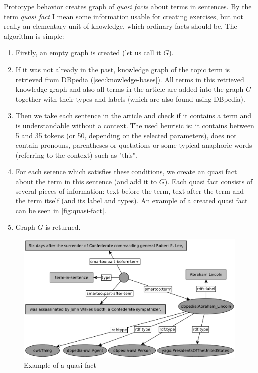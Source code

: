 \documentclass[a4paper, 12pt, twoside]{fithesis2}		%
\renewcommand{\_}{\leavevmode \kern0.07em\vbox{\hrule width0.4em}}
\newenvironment{myEnumerate}{
  \begin{enumerate}[leftmargin=2em,rightmargin=1em,itemsep=\parskip ,parsep=0em,topsep=0em,partopsep=0em]
}{
  \end{enumerate}
}
\begin{document}

Prototype behavior creates graph of \textit{quasi facts} about terms in sentences.
By the term \textit{quasi fact} I mean some information usable for creating exercises, but not really an elementary unit of knowledge, which ordinary facts should be. The algorithm is simple:
\begin{myEnumerate}
  \item Firstly, an empty graph is created (let us call it $G$).
  \item If it was not already in the past, knowledge graph of the topic term is retrieved from DBpedia (\autoref{sec:knowledge-bases}). All terms in this retrieved knowledge graph and also all terms in the article are added into the graph $G$ together with their types and labels (which are also found using DBpedia).
  \item Then we take each sentence in the article and check if it contains a term and is understandable without a context. The used heurisic is: it contains between 5 and 35 tokens (or 50, depending on the selected parameters), does not contain pronouns, parentheses or quotations or some typical anaphoric words (referring to the context) such as "this".
  \item For each setence which satisfies these conditions, we create an quasi fact about the term in this sentence (and add it to $G$). Each quasi fact consists of several pieces of information: text before the term, text after the term and the term itself (and its label and types). An example of a created quasi fact can be seen in \autoref{fig:quasi-fact}.
  \item Graph $G$ is returned.
\end{myEnumerate}


\begin{figure}[h]
  \centering
  \includegraphics[width=\textwidth]{images/quasi-fact-lincoln.pdf}
  \caption{Example of a quasi-fact}
  \label{fig:quasi-fact}
\end{figure}
\end{document}
